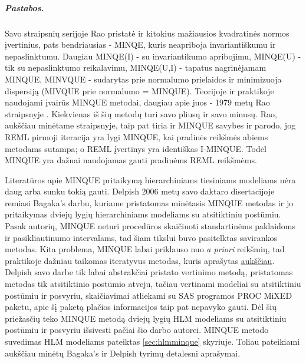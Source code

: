 \documentclass[12pt,a4paper]{article}
\begin{document}
\subparagraph{Pastabos.} Savo straipsnių serijoje Rao pristatė ir kitokius mažiausios kvadratinės normos įvertinius, pats bendriausias - MINQE, kuris neapriboja invariantiškumu ir nepaslinktumu. Daugiau MINQE(I) - su invariantikumo apribojimu, MINQE(U) - tik su nepaslinktumo reikalavimu, MINQE(U,I) - tapatus nagrinėjamam MINQUE, MINVQUE - sudarytas prie normalumo prielaidos ir minimizuoja dispersiją (MIVQUE prie normalumo = MINQUE). Teorijoje ir praktikoje naudojami įvairūs MINQUE metodai, daugiau apie juos - 1979 metų Rao straipsnyje \cite{minquereml3}. Kiekvienas iš šių metodų turi savo pliusų ir savo minusų. Rao, aukščiau minėtame straipsnyje, taip pat tiria ir MINQUE savybes ir parodo, jog REML pirmoji iteracija yra lygi MINQUE, kai pradinės reikšmės abiems metodams sutampa; o REML įvertinys yra identiškas I-MINQUE. Todėl MINQUE yra dažnai naudojamas gauti pradinėms REML reikšmėms.

\indent Literatūros apie MINQUE pritaikymą hierarchiniams tiesiniams modeliams nėra daug arba sunku tokią gauti. Delpish\cite{delpish} 2006 metų savo daktaro disertacijoje remiasi Bagaka's\cite{bagaka} darbu, kuriame pristatomas minėtasis MINQUE metodas ir jo pritaikymas dviejų lygių hierarchiniams modeliams su atsitiktiniu postūmiu. Pasak autorių, MINQUE neturi procedūros skaičiuoti standartinėms paklaidoms ir pasikliautinumo intervalams, tad šiam tikslui buvo pasitelktas savirankos metodas. Kita problema, MINQUE labai priklauso nuo \textit{a priori} reikšmių, tad praktikoje dažniau taikomas iteratyvus metodas, kuris aprašytas \hyperlink{iminque}{aukščiau}. Delpish savo darbe tik labai abstrakčiai pristato vertinimo metodą, pristatomas metodas tik atsitiktinio postūmio atveju, tačiau vertinami modeliai su atsitiktiniu postūmiu ir posvyriu, skaičiavimai atliekami su SAS programos PROC MiXED paketu, apie šį paketą plačios informacijos taip pat nepavyko gauti. Dėl šių priežasčių teko MINQUE metodą dviejų lygių HLM modeliams su atsitiktiniu postūmiu ir posvyriu išsivesti pačiai šio darbo autorei. MINQUE metodo suvedimas HLM modeliams pateiktas \ref{sec:hlmminque} skyriuje. Toliau pateikiami aukščiau minėtų Bagaka's ir Delpish tyrimų detalesni aprašymai.
\end{document}

